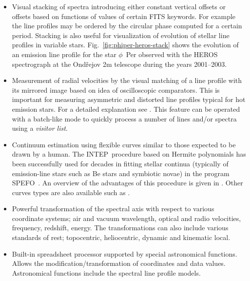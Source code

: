 \documentclass[final,authoryear,5p,times,twocolumn]{elsarticle}
\newcommand{\spefo}{\textsf{\small SPEFO}}
\newcommand{\intep}{\textsf{\small INTEP}}
\begin{document}
\begin{itemize}

\item Visual stacking of spectra introducing either constant vertical offsets
  or offsets based on functions of values of certain FITS keywords. For example
  the line profiles may be ordered by the circular phase computed for a
  certain period. Stacking is also useful for visualization of evolution of
  stellar line profiles in variable stars.
  Fig.~\ref{fig:phiper-heros-stack} shows the evolution of an emission line
  profile for the star $\phi$~Per observed with the HEROS spectrograph
  \citep{2002PAICz..90....1S} at
  the Ond\v{r}ejov 2m telescope during the years 2001--2003.

\item Measurement of radial velocities by the visual matching of a line
  profile with its mirrored image based on idea of oscilloscopic comparators.
  This is important for measuring asymmetric and distorted line profiles
  typical for hot emission stars. For a detailed explanation see
  \citet{2007IAUS..240..486P}. This feature can be operated with a batch-like
  mode to quickly process a number of lines and/or spectra using a \emph{visitor list}.

\item Continuum estimation using flexible curves similar to those expected to
  be drawn by a human. The \intep\ procedure based on Hermite polynomials
  \citep{1982PDAO...16...67H} has been successfully used for decades in
  fitting stellar continua (typically of emission-line stars such as Be stars and
  symbiotic novae) in the program \spefo\ \citep{1996ASPC..101..187S}. An
  overview of the advantages of this procedure is given in
  \citet{2008asvo.proc...97S}. Other curves types are also available such as
  \citet{Akima:1970:NMI:321607.321609}.

\item Powerful transformation of the spectral axis with respect to various
  coordinate systems; air and vacuum wavelength, optical and radio velocities,
  frequency, redshift, energy. The transformations can also include various
  standards of rest; topocentric, heliocentric, dynamic and kinematic local.

\item Built-in spreadsheet processor supported by special astronomical
  functions. Allows the modification/transformation of coordinates and data
  values. Astronomical functions include the spectral line profile models.


\end{itemize}
\end{document}
